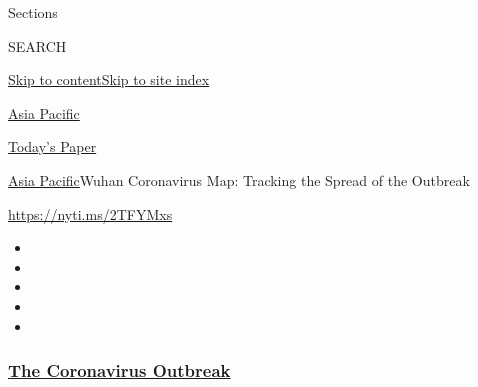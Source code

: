 Sections

SEARCH

\protect\hyperlink{site-content}{Skip to
content}\protect\hyperlink{site-index}{Skip to site index}

\href{https://www.nytimes3xbfgragh.onion/section/world/asia}{Asia
Pacific}

\href{https://myaccount.nytimes3xbfgragh.onion/auth/login?response_type=cookie\&client_id=vi}{}

\href{https://www.nytimes3xbfgragh.onion/section/todayspaper}{Today's
Paper}

\href{/section/world/asia}{Asia Pacific}\textbar{}Wuhan Coronavirus Map:
Tracking the Spread of the Outbreak

\url{https://nyti.ms/2TFYMxs}

\begin{itemize}
\item
\item
\item
\item
\item
\end{itemize}

\hypertarget{the-coronavirus-outbreak}{%
\subsubsection{\texorpdfstring{\href{https://www.nytimes3xbfgragh.onion/news-event/coronavirus?name=styln-coronavirus-national\&region=TOP_BANNER\&block=storyline_menu_recirc\&action=click\&pgtype=Interactive\&impression_id=3c549b70-f298-11ea-a60b-cf7f5b4a6ae1\&variant=undefined}{The
Coronavirus
Outbreak}}{The Coronavirus Outbreak}}\label{the-coronavirus-outbreak}}


